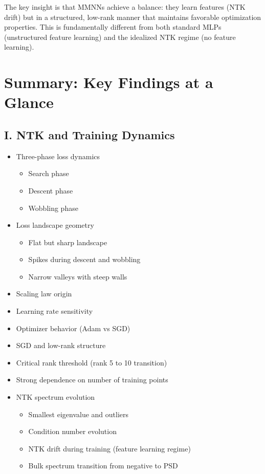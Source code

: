 \documentclass[12pt]{article}
\begin{document}
The key insight is that MMNNs achieve a balance: they learn features (NTK drift) but in a structured, low-rank manner that maintains favorable optimization properties. This is fundamentally different from both standard MLPs (unstructured feature learning) and the idealized NTK regime (no feature learning).

\newpage
\section*{Summary: Key Findings at a Glance}

\subsection*{I. NTK and Training Dynamics}
\begin{itemize}
    \item Three-phase loss dynamics
    \begin{itemize}
        \item Search phase
        \item Descent phase
        \item Wobbling phase
    \end{itemize}
    \item Loss landscape geometry
    \begin{itemize}
        \item Flat but sharp landscape
        \item Spikes during descent and wobbling
        \item Narrow valleys with steep walls
    \end{itemize}
    \item Scaling law origin
    \item Learning rate sensitivity
    \item Optimizer behavior (Adam vs SGD)
    \item SGD and low-rank structure
    \item Critical rank threshold (rank 5 to 10 transition)
    \item Strong dependence on number of training points
    \item NTK spectrum evolution
    \begin{itemize}
        \item Smallest eigenvalue and outliers
        \item Condition number evolution
        \item NTK drift during training (feature learning regime)
        \item Bulk spectrum transition from negative to PSD
    \end{itemize}
\end{itemize}
\end{document}

